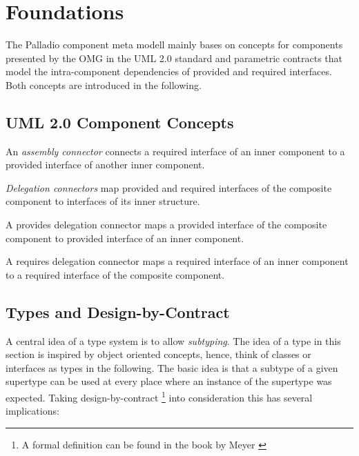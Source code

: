 %
%
%
%
%
%
%

\section{Foundations} %
\label{sec:foundations}

The Palladio component meta modell mainly bases on concepts for
components presented by the OMG in the UML 2.0 standard and parametric contracts
that model the intra-component dependencies of provided and required interfaces.
Both concepts are introduced in the following. 

\subsection{UML 2.0 Component Concepts}

An \emph{assembly connector} connects a required interface of an inner component
to a provided interface
of another inner component. 

\emph{Delegation connectors} map provided and required
interfaces of the composite component to interfaces of its inner
structure. 

A provides delegation connector maps
a provided interface of the composite component to provided interface of an
inner component. 

A requires delegation connector maps a required interface of an
inner component to a required interface of the composite component.

\subsection{Types and Design-by-Contract}
\label{types_design_by_contract}

A central idea of a type system is to allow \emph{subtyping}. The idea of a type in this section is inspired by object oriented concepts, hence, think of classes or interfaces as types in the following. The basic idea is that a subtype of a given supertype can be used at every place where an instance of the supertype was expected. Taking design-by-contract \cite{meyer1997a} \footnote{A formal definition can be found in the book by Meyer \cite{meyer1997a}} into consideration this has several implications:

